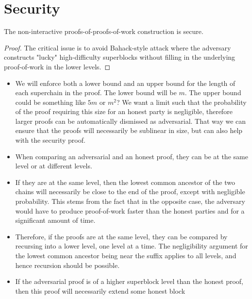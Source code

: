 \section{Security}

\begin{theorem}
    The non-interactive proofs-of-proofs-of-work construction is secure.
\end{theorem}

\begin{proof}
    The critical issue is to avoid Bahack-style attack \cite{bahack} where the
    adversary constructs "lucky" high-difficulty superblocks without filling in
    the underlying proof-of-work in the lower levels.
\end{proof}

\begin{itemize}
    \item
        We will enforce both a lower bound and an upper bound for the length of
        each superchain in the proof. The lower bound will be $m$. The upper
        bound could be something like $5m$ or $m^2$? We want a limit such that
        the probability of the proof requiring this size for an honest party is
        negligible, therefore larger proofs can be automatically dismissed as
        adversarial. That way we can ensure that the proofs will necessarily be
        sublinear in size, but can also help with the security proof.
    \item
        When comparing an adversarial and an honest proof, they can be at the
        same level or at different levels.
    \item
        If they are at the same level, then the lowest common ancestor of the
        two chains will necessarily be close to the end of the proof, except
        with negligible probability. This stems from the fact that in the
        opposite case, the adversary would have to produce proof-of-work faster
        than the honest parties and for a significant amount of time.
    \item
        Therefore, if the proofs are at the same level, they can be compared by
        recursing into a lower level, one level at a time. The negligibility
        argument for the lowest common ancestor being near the suffix applies
        to all levels, and hence recursion should be possible.
    \item
        If the adversarial proof is of a higher superblock level than the
        honest proof, then this proof will necessarily extend some honest block

\end{itemize}
